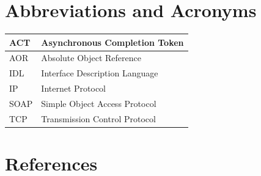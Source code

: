 \documentclass[a4paper]{article}
\begin{document}
\clearpage
\appendix
\section{Abbreviations and Acronyms}
\vspace{0.5cm}
	\begin{tabular}{|l|l|}
	\hline
	ACT & Asynchronous Completion Token\\
	\hline
	AOR & Absolute Object Reference\\
	\hline
	IDL & Interface Description Language\\
	\hline
	IP & Internet Protocol\\
	\hline
	SOAP & Simple Object Access Protocol\\
	\hline
	TCP & Transmission Control Protocol\\
	\hline
	\end{tabular}

\vspace{1cm}

\section{References}
\renewcommand{\refname}{}
\vspace{-1cm}


\end{document}
